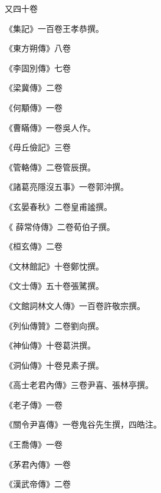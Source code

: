 \begin{pinyinscope}
 又四十卷



 《集記》一百卷王孝恭撰。



 《東方朔傳》八卷



 《李固別傳》七卷



 《梁冀傳》二卷



 《何顒傳》一卷



 《曹瞞傳》一卷吳人作。



 《毋丘儉記》三卷



 《管輅傳》二卷管辰撰。



 《諸葛亮隱沒五事》一卷郭沖撰。



 《玄晏春秋》二卷皇甫謐撰。



 《
 薛常侍傳》二卷荀伯子撰。



 《桓玄傳》二卷



 《文林館記》十卷鄭忱撰。



 《文士傳》五十卷張騭撰。



 《文館詞林文人傳》一百卷許敬宗撰。



 《列仙傳贊》二卷劉向撰。



 《神仙傳》十卷葛洪撰。



 《洞仙傳》十卷見素子撰。



 《高士老君內傳》三卷尹喜、張林亭撰。



 《老子傳》一卷



 《關令尹喜傳》一卷鬼谷先生撰，四皓注。



 《王喬傳》一卷



 《茅君內傳》一卷



 《漢武帝傳》二卷




\end{pinyinscope}
